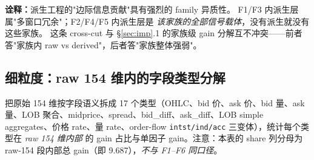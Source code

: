 \documentclass[10.5pt,a4paper]{article}
\begin{document}
\textbf{诠释：}派生工程的"边际信息贡献"具有强烈的 family 异质性。
F1/F3 内派生层属"多窗口冗余"；F2/F4/F5 内派生层是 \emph{该家族的全部信号载体}，没有派生就没有这些家族。
这条 cross-cut 与 §\ref{sec:imp}.1 的家族级 gain 分解互不冲突——前者答"家族内 raw vs derived"，后者答"家族整体强弱"。

\subsection{细粒度：raw 154 维内的字段类型分解}

把原始 154 维按字段语义拆成 17 个类型（OHLC、bid 价、ask 价、bid 量、ask 量、LOB 聚合、midprice、spread、bid\_diff、ask\_diff、LOB simple aggregates、价格 rate、量 rate、order-flow \texttt{intst/ind/acc} 三变体），统计每个类型在 \emph{raw 154 维内部} 的 gain 占比与单因子 gain。注意：本表的 share 列分母为 raw-154 段内部总 gain（即 9.687），\emph{不与 F1--F6 同口径}。
\end{document}
